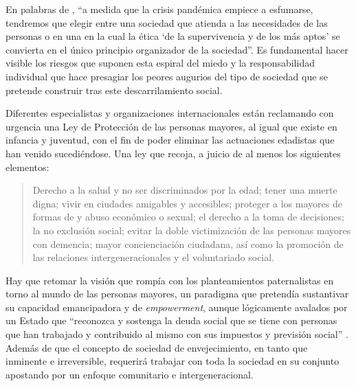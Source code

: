 \documentclass{textolivre}
\begin{document}
En palabras de \textcite[p. 11]{giroux2020}, %
“a medida que la crisis pandémica empiece a esfumarse, tendremos que elegir entre una sociedad que atienda a las necesidades de las personas o en una en la cual la ética ‘de la supervivencia y de los más aptos’ se convierta en el único principio organizador de la sociedad”. Es fundamental hacer visible los riesgos que suponen esta espiral del miedo y la responsabilidad individual que hace presagiar los peores augurios del tipo de sociedad que se pretende construir tras este descarrilamiento social.

Diferentes especialistas y organizaciones internacionales están reclamando con urgencia una Ley de Protección de las personas mayores, al igual que existe en infancia y juventud, con el fin de poder eliminar las actuaciones edadistas que han venido sucediéndose. Una ley que recoja, a juicio de \textcite[p. 155]{deusalad2020} %
al menos los siguientes elementos:

\begin{quote}
    Derecho a la salud y no ser discriminados por la edad; tener una muerte digna; vivir en 	ciudades 	amigables y accesibles; proteger a los mayores de formas de y abuso económico o sexual; el derecho a la toma de decisiones; la no exclusión social; evitar la doble victimización de las personas mayores con demencia; mayor concienciación ciudadana, así como la promoción de las relaciones intergeneracionales y el voluntariado social.
\end{quote}

Hay que retomar la visión que rompía con los planteamientos paternalistas en torno al mundo de las personas mayores, un paradigma que pretendía sustantivar su capacidad emancipadora y de \emph{empowerment}, aunque lógicamente avalados por un Estado que “reconozca y sostenga la deuda social que se tiene con personas que han trabajado y contribuido al mismo con sus impuestos y previsión social” \cite{klein2020}. %
Además de que el concepto de sociedad de envejecimiento, en tanto que inminente e irreversible, requerirá trabajar con toda la sociedad en su conjunto apostando por un enfoque comunitario e intergeneracional.
\end{document}
